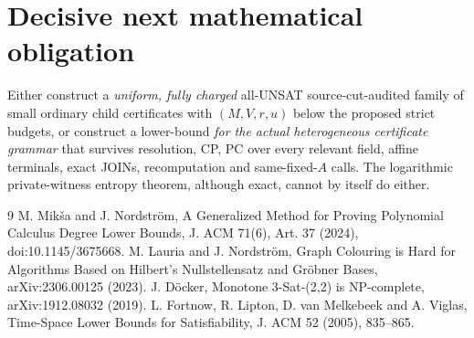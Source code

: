 \documentclass[11pt]{article}
\begin{document}
\section{Decisive next mathematical obligation}
Either construct a \emph{uniform, fully charged} all-UNSAT
source-cut-audited family of small ordinary child certificates
with $(M,V,r,u)$ below the proposed strict budgets,
or construct a lower-bound \emph{for the actual heterogeneous
certificate grammar} that survives resolution, CP, PC over
every relevant field, affine terminals, exact JOINs,
recomputation and same-fixed-$A$ calls.
The logarithmic private-witness entropy theorem, although
exact, cannot by itself do either.
\begin{thebibliography}{9}
 M. Mik\v{s}a and J. Nordstr\"om,
A Generalized Method for Proving Polynomial Calculus
Degree Lower Bounds, J. ACM 71(6), Art. 37 (2024),
doi:10.1145/3675668.
 M. Lauria and J. Nordstr\"om,
Graph Colouring is Hard for Algorithms Based on
Hilbert's Nullstellensatz and Gr\"obner Bases,
arXiv:2306.00125 (2023).
 J. D\"ocker,
Monotone 3-Sat-(2,2) is NP-complete,
arXiv:1912.08032 (2019).
 L. Fortnow, R. Lipton, D. van Melkebeek
and A. Viglas, Time-Space Lower Bounds for
Satisfiability, J. ACM 52 (2005), 835--865.
\end{thebibliography}
\end{document}
